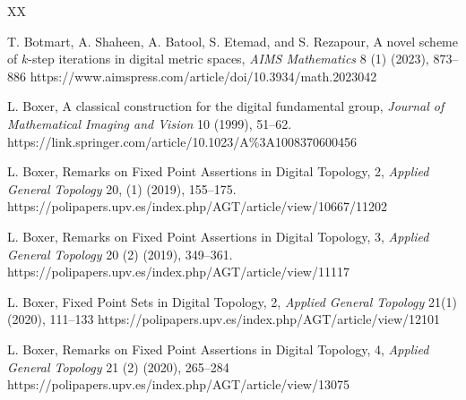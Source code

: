 \documentclass{article}
\numberwithin{thm}{section}
\begin{document}
\begin{thebibliography}{XX}

T. Botmart, 
A. Shaheen, 
A. Batool, 
S. Etemad, and 
S. Rezapour,
A novel scheme of $k$-step iterations
in digital metric spaces, 
{\em AIMS Mathematics} 
8 (1) (2023), 873--886
\newline
https://www.aimspress.com/article/doi/10.3934/math.2023042 

L. Boxer, A classical construction for the digital fundamental group, 
{\em Journal of Mathematical Imaging and Vision} 10 (1999),
51--62.
\newline
https://link.springer.com/article/10.1023/A$\%$3A1008370600456

L. Boxer, 
Remarks on Fixed Point Assertions in Digital Topology, 2, 
{\em Applied General Topology} 20, (1) (2019), 155--175.
\newline
https://polipapers.upv.es/index.php/AGT/article/view/10667/11202

L. Boxer, Remarks on Fixed Point Assertions in Digital Topology, 3,
{\em Applied General Topology} 20 (2) (2019), 349--361. 
\newline
https://polipapers.upv.es/index.php/AGT/article/view/11117

L. Boxer, Fixed Point Sets in Digital Topology, 2,
{\em Applied General Topology} 21(1) 
(2020), 111--133 \newline
https://polipapers.upv.es/index.php/AGT/article/view/12101

 L. Boxer, Remarks on Fixed Point Assertions in Digital Topology, 4, 
 {\em Applied General Topology} 21 (2) (2020), 265--284
\newline
https://polipapers.upv.es/index.php/AGT/article/view/13075


\end{thebibliography}
\end{document}

